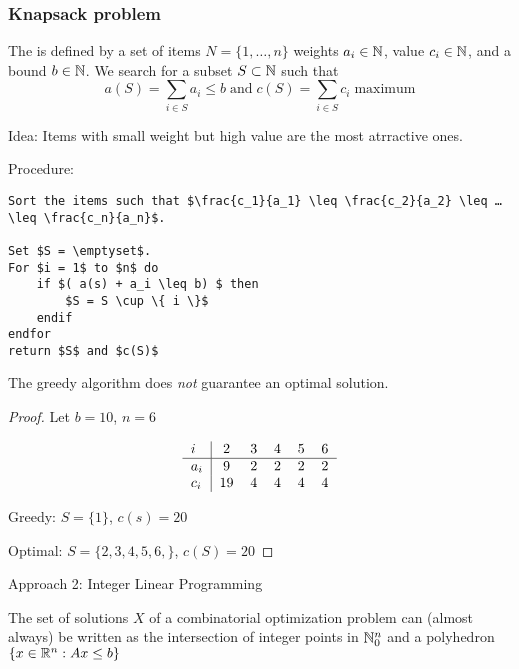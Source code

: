 \begin{lec}[2011-10-26]\end{lec}

\subsubsection*{Knapsack problem} 

\begin{defn} %
	The  is defined by a set of items $N = \{ 1, … , n \}$ weights $a_i \in \mathbb{N}$, value $c_i \in \mathbb{N}$, and a bound $b\in \mathbb{N}$. We search for a subset $S\subset \mathbb{N}$ such that 
	\[
		a(S) = \sum_{i \in S} a_i \leq b \; \text{and} \; c(S) = \sum_{i\in S} c_i \; \text{maximum}
	\]
\end{defn}


Idea: Items with small weight but high value are the most atrractive ones.

Procedure:
\begin{lstlisting}
Sort the items such that $\frac{c_1}{a_1} \leq \frac{c_2}{a_2} \leq … \leq \frac{c_n}{a_n}$.

Set $S = \emptyset$.
For $i = 1$ to $n$ do
	if $( a(s) + a_i \leq b) $ then
		$S = S \cup \{ i \}$
	endif
endfor
return $S$ and $c(S)$
\end{lstlisting}

\begin{thm}
	The greedy algorithm does \emph{ not } guarantee an optimal solution.
\end{thm}

\begin{proof}
	Let $b=10$, $n = 6$
	
	\begin{align*}
		\begin{tabular}{l|ccccc}
			$i$ & 2 & 3 & 4 & 5 & 6 \\ \hline
			$a_i$ & 9 & 2 & 2 & 2 & 2 \\
			$c_i$ &19 & 4 & 4 & 4 & 4
		\end{tabular}
	\end{align*}
	
	Greedy: $S=\{1\}$, $c(s)=20$
	
	Optimal: $S=\{2,3,4,5,6,\}$, $c(S)=20$
\end{proof}

Approach 2: Integer Linear Programming

The set of solutions $X$ of a combinatorial optimization problem can (almost always) be written as the intersection of integer points in $\mathbb{N}_0^n$ and a polyhedron $\{x \in \mathbb{R}^n: Ax\leq b\}$

